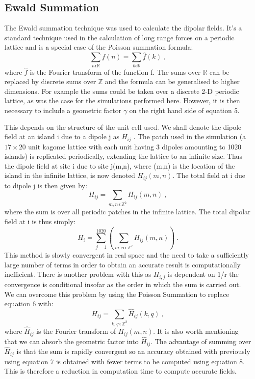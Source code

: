 \subsection{Ewald Summation}
The Ewald summation technique was used to calculate the dipolar fields. It's a standard technique used in the calculation of long range forces on a periodic lattice and is a special case of the Poisson summation formula:
\begin{equation}
    \sum_{n \epsilon \mathbb{R}} f(n) = \sum_{k \epsilon \mathbb{R}} \hat{f}(k) \ ,
\end{equation}
where $\hat{f}$ is the Fourier transform of the function f. The sums over $\mathbb{R}$ can be replaced by discrete sums over $\mathbb{Z}$ and the formula can be generalised to higher dimensions. For example the sums could be taken over a discrete 2-D periodic lattice, as was the case for the simulations performed here. However, it is then
necessary to include a geometric factor $\gamma$ on the right hand side of equation 5.
\par
This depends on the structure of the unit cell used. We shall denote the dipole field at an island i due to a dipole j as $H_{ij}$ . The
patch used in the simulation (a $17 \times 20$ unit kagome lattice with each unit having 3 dipoles amounting to 1020 islands) is replicated periodically, extending the lattice to an infinite size. Thus the dipole field at site i due to site j(m,n), where (m,n) is the location of the island in the infinite lattice, is now denoted $H_{ij}(m,n)$. The total field at i due to dipole j is then given by:
\begin{equation}
    H_{ij} = \sum_{m,n \, \epsilon \, {\mathbb{Z}}^2} H_{ij}(m,n) \ ,
\end{equation}
where the sum is over all periodic patches in the infinite lattice. The total dipolar field at i is thus simply:
\begin{equation}
    H_{i} = \sum_{j=1}^{1020} \left( \sum_{m,n \, \epsilon \, {\mathbb{Z}}^2} H_{ij}(m,n) \right) \ .
\end{equation}
This method is slowly convergent in real space and the need to take a sufficiently large number of terms in order to obtain an accurate result is computationally inefficient.  There is another problem with this as $H_{i,j}$ is dependent on 1/r the convergence is conditional insofar as the order in which the sum is carried out.  We can overcome this problem by using the Poisson Summation to replace equation 6 with:
\begin{equation}
    H_{ij} = \sum_{k,q \, \epsilon \, {\mathbb{Z}}^2} \hat{H}_{ij}(k,q) \ ,
\end{equation}
where $\hat{H}_{ij}$ is the Fourier transform of $H_{ij}(m,n)$.  It is also worth mentioning that we can absorb the geometric factor into $\hat{H}_{ij}$.  The advantage of summing over $\hat{H}_{ij}$ is that the sum is rapidly convergent so an accuracy obtained with previously using equation 7 is obtained with fewer terms to be computed using equation 8.  This is therefore a reduction in computation time to compute accurate fields.
\clearpage
